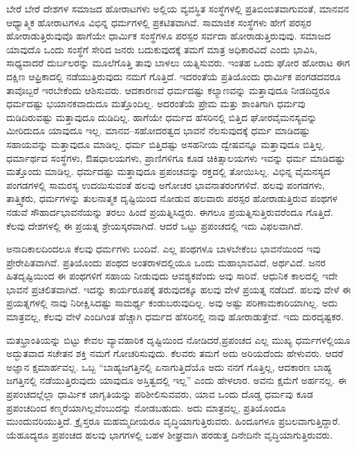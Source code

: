 \vskip 0.2cm

ಬೇರೆ ಬೇರೆ ದೇಶಗಳ ಸಮಾಜದ ಹೋರಾಟಗಳು ಅಲ್ಲಿಯ ವ್ಯವಸ್ಥಿತ ಸಂಸ್ಥೆಗಳಲ್ಲಿ ಪ್ರತಿಬಿಂಬಿತವಾಗುವಂತೆ, ಮಾನವನ ಆಧ್ಯಾತ್ಮಿಕ ಹೋರಾಟಗಳೂ ವಿಭಿನ್ನ ಧರ್ಮಗಳಲ್ಲಿ ಪ್ರಕಟಿತವಾಗಿವೆ. ಸಾಮಾಜಿಕ ಸಂಸ್ಥೆಗಳು ಹೇಗೆ ಪರಸ್ಪರ ಹೋರಾಡುತ್ತಿರುವುವೊ ಹಾಗೆಯೇ ಧಾರ್ಮಿಕ ಸಂಸ್ಥೆಗಳೂ ಪರಸ್ಪರ ಸರ್ವದಾ ಹೋರಾಡುತ್ತಿರುವುವು. ಸಮಾಜದ ಯಾವುದೊ ಒಂದು ಸಂಸ್ಥೆಗೆ ಸೇರಿದ ಜನರು ಬದುಕುವುದಕ್ಕೆ ತಮಗೆ ಮಾತ್ರ ಅಧಿಕಾರವಿದೆ ಎಂದು ಭಾವಿಸಿ, ಸಾಧ್ಯವಾದರೆ ದುರ್ಬಲರನ್ನು ಮೂಲೆಗೊತ್ತಿ ತಾವು ಬಾಳಲು ಯತ್ನಿಸುವರು. ಇಂತಹ ಒಂದು ಘೋರ ಹೋರಾಟ ಈಗ ದಕ್ಷಿಣ ಆಫ್ರಿಕಾದಲ್ಲಿ ನಡೆಯುತ್ತಿರುವುದು ನಮಗೆ ಗೊತ್ತಿದೆ. ಇದರಂತೆಯೆ ಪ್ರತಿಯೊಂದು ಧಾರ್ಮಿಕ ಪಂಗಡದವರೂ ತಾವೊಬ್ಬರೆ ಇರಬೇಕೆಂದು ಆಶಿಸುವರು. ಆದಕಾರಣವೆ ಧರ್ಮದಷ್ಟು ಕಲ್ಯಾಣವನ್ನು ಮತ್ತಾವುದೂ ನೀಡದಿದ್ದರೂ ಧರ್ಮದಷ್ಟು ಭಯಾನಕವಾದುದೂ ಮತ್ತೊಂದಿಲ್ಲ. ಅದರಂತೆಯೆ ಪ್ರೇಮ ಮತ್ತು ಶಾಂತಿಗಾಗಿ ಧರ್ಮವು ದುಡಿದಿರುವಷ್ಟು ಮತ್ತಾವುದೂ ದುಡಿದಿಲ್ಲ. ಹಾಗೆಯೇ ಧರ್ಮದ ಹೆಸರಿನಲ್ಲಿ ಬಿತ್ತಿದ ಘೋರವೈಮನಸ್ಯವನ್ನು ಮೀರಿದುದೂ ಯಾವುದೂ ಇಲ್ಲ. ಮಾನವ–ಸಹೋದರತ್ವದ ಭಾವನೆ ನೆಲಸುವುದಕ್ಕೆ ಧರ್ಮ ಮಾಡಿದಷ್ಟು ಸಹಾಯವನ್ನು ಮತ್ತಾವುದೂ ಮಾಡಿಲ್ಲ. ಧರ್ಮ ಬಿತ್ತಿದಷ್ಟು ಅಸಹನೀಯ ದ್ವೇಷವನ್ನೂ ಮತ್ತಾವುದೂ ಬಿತ್ತಿಲ್ಲ. ಧರ್ಮಾರ್ಥದ ಸಂಸ್ಥೆಗಳು, ಔಷಧಾಲಯಗಳು, ಪ್ರಾಣಿಗಳಿಗೂ ಕೂಡ ಚಿಕಿತ್ಸಾಲಯಗಳು ಇವನ್ನು ಧರ್ಮ ಮಾಡಿದಷ್ಟು ಮತ್ತೊಂದು ಮಾಡಿಲ್ಲ. ಧರ್ಮದಷ್ಟು ಮತ್ತಾವುದೂ ಪ್ರಪಂಚವನ್ನು ರಕ್ತದಲ್ಲಿ ತೋಯಿಸಿಲ್ಲ. ವಿಭಿನ್ನ ವೈಮನಸ್ಯದ ಪಂಗಡಗಳಲ್ಲಿ ಸಾಮರಸ್ಯ ಉದಯಿಸುವಂತೆ ಹಲವು ಅಗೋಚರ ಭಾವನಾತರಂಗಗಳಿವೆ. ಹಲವು ಪಂಗಡಗಳು, ತಾತ್ತ್ವಿಕರು, ಧರ್ಮಗಳನ್ನು ತುಲನಾತ್ಮಕ ದೃಷ್ಟಿಯಿಂದ ನೋಡುವ ಹಲವಾರು ಪರಸ್ಪರ ಹೋರಾಡುತ್ತಿರುವ ಪಂಥಗಳ ನಡುವೆ ಸೌಹಾರ್ದಭಾವನೆಯನ್ನು ತರಲು ಹಿಂದೆ ಪ್ರಯತ್ನಿಸಿದ್ದರು. ಈಗಲೂ ಪ್ರಯತ್ನಿಸುತ್ತಿರುವರೆಂದೂ ಗೊತ್ತಿದೆ. ಕೆಲವು ದೇಶಗಳಲ್ಲಿ ಈ ಪ್ರಯತ್ನ ಶ್ರೇಯಸ್ಕರವಾಗಿದೆ. ಆದರೆ ಒಟ್ಟು ಪ್ರಪಂಚದಲ್ಲಿ ಇದು ವಿಫಲವಾಗಿದೆ.

\vskip 0.2cm

ಅನಾದಿಕಾಲದಿಂದಲೂ ಕೆಲವು ಧರ್ಮಗಳು ಬಂದಿವೆ. ಎಲ್ಲ ಪಂಥಗಳೂ ಬಾಳಬೇಕೆಂಬ ಭಾವನೆಯಿಂದ ಇವು ಪ್ರೇರೇಪಿತವಾಗಿವೆ. ಪ್ರತಿಯೊಂದು ಪಂಥದ ಅಂತರಾಳದಲ್ಲಿಯೂ ಒಂದು ಮಹಾಭಾವವಿದೆ, ಅರ್ಥವಿದೆ. ಜನರ ಹಿತದೃಷ್ಟಿಯಿಂದ ಈ ಪಂಥಗಳಿಗೆ ಸಹಾಯ ನೀಡುವುದು ಆವಶ್ಯಕವೆಂದು ಅವು ಸಾರಿವೆ. ಆಧುನಿಕ ಕಾಲದಲ್ಲಿ ಇದೇ ಭಾವನೆ ಪ್ರಚಲಿತವಾಗಿದೆ. ಇದನ್ನು ಕಾರ್ಯರೂಪಕ್ಕೆ ತರುವುದಕ್ಕೂ ಹಲವು ವೇಳೆ ಪ್ರಯತ್ನ ನಡೆದಿದೆ. ಹಲವು ವೇಳೆ ಈ ಪ್ರಯತ್ನಗಳಲ್ಲಿ ನಾವು ನಿರೀಕ್ಷಿಸಿದಷ್ಟು ಸಾಮರ್ಥ್ಯ ಕಂಡುಬರುವುದಿಲ್ಲ. ಅವು ಅಷ್ಟು ಪರಿಣಾಮಕಾರಿಯಾಗಿಲ್ಲ. ಅದು ಮಾತ್ರವಲ್ಲ, ಕೆಲವು ವೇಳೆ ಎಂದಿಗಿಂತ ಹೆಚ್ಚಾಗಿ ಧರ್ಮದ ಹೆಸರಿನಲ್ಲಿ ನಾವು ಹೋರಾಡುತ್ತೇವೆ. ಇದು ದುರದೃಷ್ಟಕರ.

\vskip 5pt

ಮತಭ್ರಾಂತಿಯನ್ನು ಬಿಟ್ಟು ಕೇವಲ ವ್ಯಾವಹಾರಿಕ ದೃಷ್ಟಿಯಿಂದ ನೋಡಿದರೆ,\break ಪ್ರಪಂಚದ ಎಲ್ಲ ಮುಖ್ಯ ಧರ್ಮಗಳಲ್ಲಿಯೂ ಅದ್ಭುತವಾದ ಸಚೇತನ ಶಕ್ತಿ ನಮಗೆ ಗೋಚರಿಸುವುದು. ಕೆಲವರು ತಮಗೆ ಅದು ಅರಿಯದೆಂದು ಹೇಳುವರು. ಆದರೆ ಅಜ್ಞಾನ ಕ್ಷಮಾರ್ಹವಲ್ಲ. ಒಬ್ಬ “ಬಾಹ್ಯಜಗತ್ತಿನಲ್ಲಿ ಏನಾಗುತ್ತಿದೆಯೊ ಅದು ನನಗೆ ಗೊತ್ತಿಲ್ಲ, ಆದಕಾರಣ ಬಾಹ್ಯ ಜಗತ್ತಿನಲ್ಲಿ ನಡೆಯುತ್ತಿರುವುದು ಯಾವುದೂ ಅಸ್ತಿತ್ವದಲ್ಲಿ ಇಲ್ಲ” ಎಂದು ಹೇಳಲಾರ. ಅವನು ಕ್ಷಮೆಗೆ ಅರ್ಹನಲ್ಲ. ಈ ಪ್ರಪಂಚದಲ್ಲೆಲ್ಲಾ ಧಾರ್ಮಿಕ ಜಾಗೃತಿಯನ್ನು ಪರಿಶೀಲಿಸುವವರು, ಯಾವ ಒಂದು ದೊಡ್ಡ ಧರ್ಮವು ಕೂಡ ಪ್ರಪಂಚದಿಂದ ಕಣ್ಮರೆ\break ಯಾಗಿಲ್ಲವೆಂಬುದನ್ನು ನೋಡಬಹುದು. ಅದು ಮಾತ್ರವಲ್ಲ, ಪ್ರತಿಯೊಂದೂ ಮುಂದುವರಿಯುತ್ತಿದೆ. ಕ್ರೈಸ್ತರೂ ಮಹಮ್ಮದೀಯರೂ ವೃದ್ಧಿಯಾಗುತ್ತಿರುವರು. ಹಿಂದೂಗಳೂ ಪ್ರಬಲವಾಗುತ್ತಿದ್ದಾರೆ. ಯೆಹೂದ್ಯರೂ ಪ್ರಪಂಚದ ಹಲವು ಭಾಗಗಳಲ್ಲಿ ಬಹಳ ಶೀಘ್ರವಾಗಿ ಹರಡುತ್ತ ದಿನೇದಿನೇ ವೃದ್ಧಿಯಾಗುತ್ತಿರುವರು.

